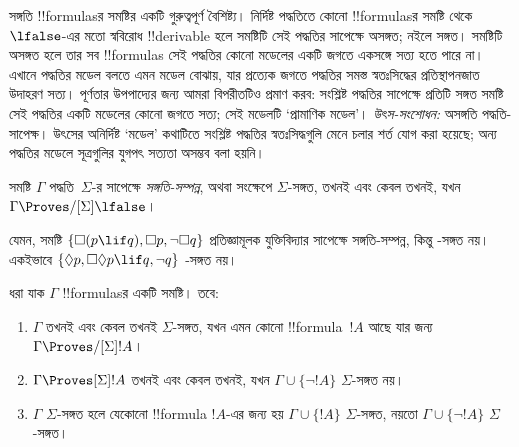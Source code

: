 \documentclass[../../../include/open-logic-section]{subfiles}
\begin{document}


সঙ্গতি !!{formula}sর সমষ্টির একটি গুরুত্বপূর্ণ বৈশিষ্ট্য। নির্দিষ্ট পদ্ধতিতে কোনো !!{formula}sর সমষ্টি থেকে~$\lfalse$-এর মতো স্ববিরোধ !!{derivable} হলে সমষ্টিটি সেই পদ্ধতির সাপেক্ষে অসঙ্গত; নইলে সঙ্গত। সমষ্টিটি অসঙ্গত হলে তার সব !!{formula}s সেই পদ্ধতির কোনো মডেলের একটি জগতে একসঙ্গে সত্য হতে পারে না। এখানে পদ্ধতির মডেল বলতে এমন মডেল বোঝায়, যার প্রত্যেক জগতে পদ্ধতির সমস্ত স্বতঃসিদ্ধের প্রতিস্থাপনজাত উদাহরণ সত্য। পূর্ণতার উপপাদ্যের জন্য আমরা বিপরীতটিও প্রমাণ করব: সংশ্লিষ্ট পদ্ধতির সাপেক্ষে প্রতিটি সঙ্গত সমষ্টি সেই পদ্ধতির একটি মডেলের কোনো জগতে সত্য; সেই মডেলটি ‘প্রামাণিক মডেল’।
\emph{উৎস-সংশোধন:} অসঙ্গতি পদ্ধতি-সাপেক্ষ। উৎসের অনির্দিষ্ট ‘মডেল’ কথাটিতে সংশ্লিষ্ট পদ্ধতির স্বতঃসিদ্ধগুলি মেনে চলার শর্ত যোগ করা হয়েছে; অন্য পদ্ধতির মডেলে সূত্রগুলির যুগপৎ সত্যতা অসম্ভব বলা হয়নি।

\begin{defn}
  সমষ্টি $\Gamma$ পদ্ধতি~$\Sigma$-র সাপেক্ষে \emph{সঙ্গতি-সম্পন্ন}, অথবা সংক্ষেপে $\Sigma$-সঙ্গত, তখনই এবং কেবল তখনই, যখন $\Gamma \Proves/[\Sigma] \lfalse$।
\end{defn}

যেমন, সমষ্টি $\{ \Box(p \lif q), \Box p, \lnot\Box q \}$ প্রতিজ্ঞামূলক যুক্তিবিদ্যার সাপেক্ষে সঙ্গতি-সম্পন্ন, কিন্তু -সঙ্গত নয়। একইভাবে $\{ \Diamond p, \Box\Diamond p \lif q, \lnot q \}$ -সঙ্গত নয়।

\begin{prop}
  ধরা যাক $\Gamma$ !!{formula}sর একটি সমষ্টি। তবে:
  \begin{enumerate}
  \item $\Gamma$ তখনই এবং কেবল তখনই $\Sigma$-সঙ্গত, যখন এমন কোনো !!{formula}~$!A$ আছে যার জন্য $\Gamma \Proves/[\Sigma] !A$।
  \item {}%
    $\Gamma \Proves[\Sigma] !A$ তখনই এবং কেবল তখনই, যখন $\Gamma \cup \{ \lnot!A \}$ $\Sigma$-সঙ্গত নয়।
  \item {}%
    $\Gamma$ $\Sigma$-সঙ্গত হলে যেকোনো !!{formula} $!A$-এর জন্য হয় $\Gamma \cup \{ !A \}$ $\Sigma$-সঙ্গত, নয়তো $\Gamma \cup \{ \lnot!A \}$ $\Sigma$-সঙ্গত।
  \end{enumerate}
\end{prop}
\end{document}
